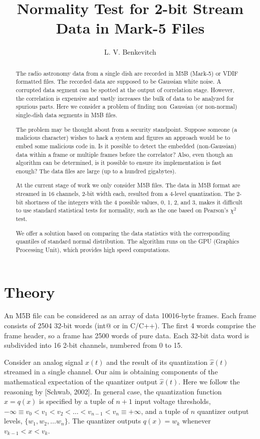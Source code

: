 \documentclass[letterpaper,twoside,12pt]{article}
\title{Normality Test for 2-bit Stream Data in Mark-5 Files}
\author[1]{L. V. Benkevitch}
\affil[1]{\small MIT Haystack observatory, Westford, MA 01886, USA.}
\begin{document}
\maketitle

\begin{abstract}
The radio astronomy data from a single dish are recorded in M5B (Mark-5) or VDIF formatted files. The recorded data are supposed to be Gaussian white noise. A corrupted data segment can be spotted at the output of correlation stage. However, the correlation is expensive and vastly increases the bulk of data to be analyzed for spurious parts. Here we consider a problem of finding non~Gaussian (or non-normal) single-dish data segments in M5B files.

The problem may be thought about from a security standpoint. Suppose someone (a malicious character) wishes to hack a system and figures an approach would be to embed some malicious code in. Is it possible to detect the embedded (non-Gaussian) data within a frame or multiple frames before the correlator? Also, even though an algorithm can be determined, is it possible to ensure its implementation is fast enough? The data files are large (up to a hundred gigabytes).

At the current stage of work we only consider M5B files. The data in M5B format are streamed in 16 channels, 2-bit width each, resulted from a 4-level quantization. The 2-bit shortness of the integers with the 4 possible values, 0, 1, 2, and 3, makes it difficult to use standard statistical tests for normality, such as the one based on Pearson's $\chi^2$ test.     
 
We offer a solution based on comparing the data statistics with the corresponding quantiles of standard normal distribution. The algorithm runs on the GPU (Graphics Processing Unit), which provides high speed computations.
\end{abstract}


\section{Theory}

An M5B file can be considered as an array of data 10016-byte frames. Each frame consists of 2504 32-bit words (\verb@unsigned int@ or  \verb@uint@ in C/C++). The first 4 words comprise the frame header, so a frame has 2500 words of pure data. Each 32-bit data word is subdivided into 16 2-bit channels, numbered from 0 to 15. 

Consider an analog signal $x(t)$ and the result of its quantization $\hat{x}(t)$ streamed in a single channel. Our aim is obtaining components of the mathematical expectation of the quantizer output $\hat{x}(t)$. Here we follow the reasoning by [Schwab, 2002]. In general case, the quantization function $\hat{x} = q(x)$ is specified by a tuple of $n+1$ input voltage thresholds, 
$-\infty \equiv v_0 < v_1 < v_2 < \ldots  < v_{n-1} < v_n \equiv +\infty$, and a tuple of $n$ quantizer output levels, $\{ w_1, w_2, \ldots w_n \}$. The quantizer outputs $q(x) = w_k$ whenever $v_{k-1} < x < v_k$.
\end{document}
